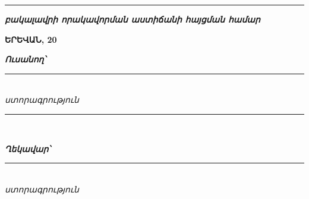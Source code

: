 \documentclass[12pt,a4paper]{report}
\begin{document}
\begin{titlepage}
\begin{center}
\begin{minipage}{0.9\textwidth}
\centering
{\fontsize{14pt}{18pt}\selectfont\bfseries\itshape
\rule{8.2cm}{0.4pt}
}
\end{minipage}

\vspace{0.2cm}

\begin{minipage}{0.9\textwidth}
\centering
{\fontsize{14pt}{18pt}\selectfont\bfseries\itshape
բակալավրի որակավորման աստիճանի հայցման համար
}
\end{minipage}

\vfill

{\fontsize{13pt}{16pt}\selectfont\bfseries ԵՐԵՎԱՆ, 20\underline{\hspace{0.7cm}}}

\end{center}

\end{titlepage}


\newpage
\thispagestyle{empty}

\vspace*{1.6cm}

\noindent
{\fontsize{13pt}{16pt}\selectfont\bfseries\itshape Ուսանող՝}
\hspace{0.3cm}
\begin{minipage}[t]{7.0cm}
\vspace{-0.35cm}
\rule{7.0cm}{0.4pt}\\[-0.15cm]
\centering
{\fontsize{10pt}{12pt}\selectfont\itshape ստորագրություն}
\end{minipage}

\vspace{0.55cm}

\noindent\rule{\textwidth}{0.4pt}\\[-0.15cm]

\vspace{2.7cm}

\noindent
{\fontsize{13pt}{16pt}\selectfont\bfseries\itshape Ղեկավար՝}
\hspace{0.3cm}
\begin{minipage}[t]{7.0cm}
\vspace{-0.35cm}
\rule{7.0cm}{0.4pt}\\[-0.15cm]
\centering
{\fontsize{10pt}{12pt}\selectfont\itshape ստորագրություն}
\end{minipage}
\end{document}
